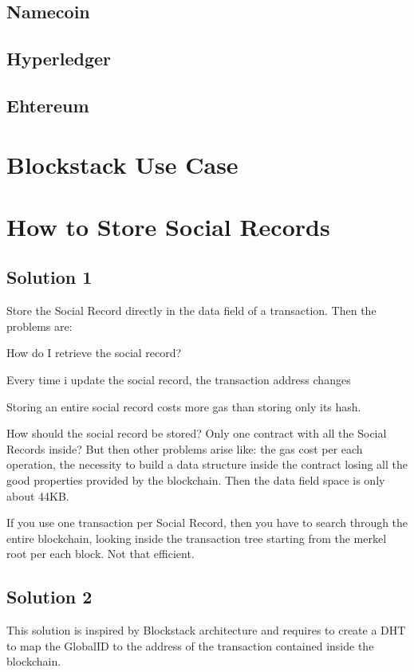 \subsection*{Namecoin}
\subsection*{Hyperledger}
\subsection*{Ehtereum}
\section{Blockstack Use Case}
\section{How to Store Social Records}
\subsection{Solution 1}
Store the Social Record directly in the data field of a transaction. 
Then the problems are: 

\begin{list}{}{}
\item How do I retrieve the social record?
\item Every time i update the social record, the transaction address changes
\item Storing an entire social record costs more gas than storing only its hash.
\item How should the social record be stored? Only one contract with all the Social Records inside? But then other problems arise like: the gas cost per each operation, the necessity to build a data structure inside the contract losing all the good properties provided by the blockchain. Then the data field space is only about 44KB.
\item If you use one transaction per Social Record, then you have to search through the entire blockchain, looking inside the transaction tree starting from the merkel root per each block. Not that efficient. 
\end{list}

\subsection{Solution 2}
This solution is inspired by Blockstack architecture and requires to create a DHT to map the GlobalID to the address of the transaction contained inside the blockchain. 

